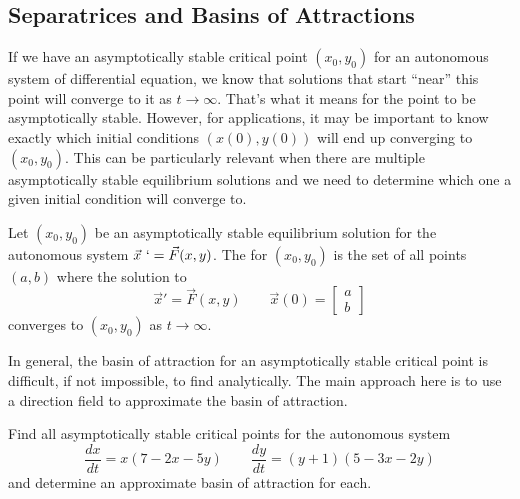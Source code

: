 \subsection{Separatrices and Basins of Attractions}

If we have an asymptotically stable critical point $(x_0, y_0)$ for an autonomous system of differential equation, we know that solutions that start ``near'' this point will converge to it as $t \rightarrow \infty$. That's what it means for the point to be asymptotically stable. However, for applications, it may be important to know exactly which initial conditions $(x(0), y(0))$ will end up converging to $(x_0, y_0)$. This can be particularly relevant when there are multiple asymptotically stable equilibrium solutions and we need to determine which one a given initial condition will converge to. 

\begin{definition}
Let $(x_0, y_0)$ be an asymptotically stable equilibrium solution for the autonomous system $\vec{x}\ ` = \vec{F}(x,y)$. The \emph{} for $(x_0, y_0)$ is the set of all points $(a,b)$ where the solution to
\begin{equation*}
\vec{x}' = \vec{F}(x,y) \qquad \vec{x}(0) = \begin{bmatrix} a \\ b \end{bmatrix}
\end{equation*}
converges to $(x_0, y_0)$ as $t \rightarrow \infty$.
\end{definition}

In general, the basin of attraction for an asymptotically stable critical point is difficult, if not impossible, to find analytically. The main approach here is to use a direction field to approximate the basin of attraction.

\begin{example} \label{ex:BoA}
Find all asymptotically stable critical points for the autonomous system
\begin{equation*}
\frac{dx}{dt} = x(7-2x-5y) \qquad \frac{dy}{dt} =(y+1)(5-3x-2y)
\end{equation*}
and determine an approximate basin of attraction for each. 
\end{example}

